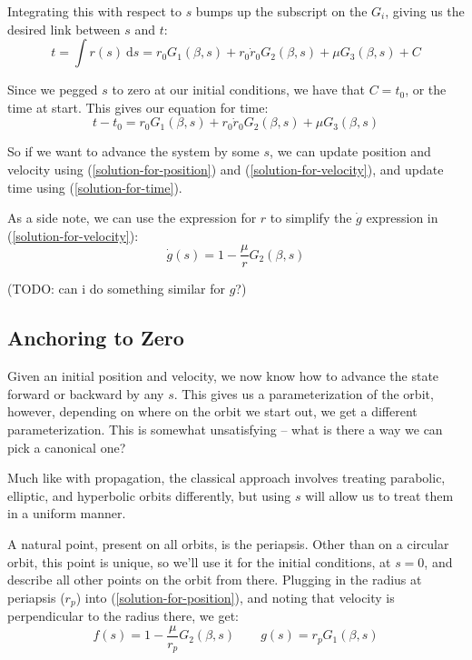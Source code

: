 \documentclass{article}
\newcommand{\dd}{\mathrm{d}}
\numberwithin{equation}{subsection}
\begin{document}
Integrating this with respect to $s$ bumps up the subscript on the $G_i$, giving us the desired link between $s$ and $t$:
\begin{equation}
t = \int r(s)~\dd s = r_0 G_1(\beta, s) + r_0 \dot{r}_0 G_2(\beta, s) + \mu G_3(\beta, s) + C
\end{equation}

Since we pegged $s$ to zero at our initial conditions, we have that $C = t_0$, or the time at start. This gives our equation for time:
\begin{equation}
\label{solution-for-time}
t - t_0 = r_0 G_1(\beta, s) + r_0 \dot{r}_0 G_2(\beta, s) + \mu G_3(\beta, s)
\end{equation}

So if we want to advance the system by some $s$, we can update position and velocity using (\ref{solution-for-position}) and (\ref{solution-for-velocity}), and update time using (\ref{solution-for-time}).

As a side note, we can use the expression for $r$ to simplify the $\dot g$ expression in (\ref{solution-for-velocity}):
\begin{equation}
\dot g(s) = 1 - \frac{\mu}{r} G_2(\beta, s)
\end{equation}

(TODO: can i do something similar for $g$?)


\subsection{Anchoring to Zero}

Given an initial position and velocity, we now know how to advance the state forward or backward by any $s$. This gives us a parameterization of the orbit, however, depending on where on the orbit we start out, we get a different parameterization. This is somewhat unsatisfying -- what is there a way we can pick a canonical one?

Much like with propagation, the classical approach involves treating parabolic, elliptic, and hyperbolic orbits differently, but using $s$ will allow us to treat them in a uniform manner.

A natural point, present on all orbits, is the periapsis. Other than on a circular orbit, this point is unique, so we'll use it for the initial conditions, at $s = 0$, and describe all other points on the orbit from there. Plugging in the radius at periapsis ($r_p$) into (\ref{solution-for-position}), and noting that velocity is perpendicular to the radius there, we get:
\begin{equation}
\label{solution-for-position-periapsis}
f(s) = 1 - \frac{\mu}{r_p} G_2(\beta, s) \qquad g(s) = r_p G_1(\beta, s)
\end{equation}
\end{document}
